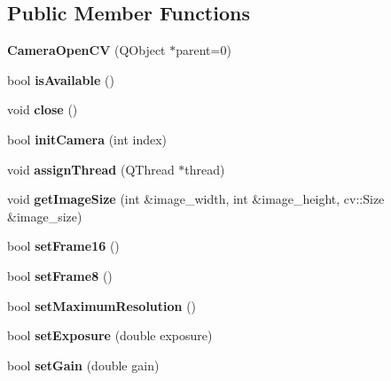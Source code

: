 \subsection*{Public Member Functions}
\begin{DoxyCompactItemize}
\item 
\hypertarget{class_camera_open_c_v_a11513f82fb6525837b669a1f577a4b4c}{}{\bfseries Camera\+Open\+C\+V} (Q\+Object $\ast$parent=0)\label{class_camera_open_c_v_a11513f82fb6525837b669a1f577a4b4c}

\item 
\hypertarget{class_camera_open_c_v_a4f74abae529642b30ed20e7edd34f242}{}bool {\bfseries is\+Available} ()\label{class_camera_open_c_v_a4f74abae529642b30ed20e7edd34f242}

\item 
\hypertarget{class_camera_open_c_v_af0aaccf4308f82ce69f9291734145b0f}{}void {\bfseries close} ()\label{class_camera_open_c_v_af0aaccf4308f82ce69f9291734145b0f}

\item 
\hypertarget{class_camera_open_c_v_a85716a1a309bf8269d3767002989c126}{}bool {\bfseries init\+Camera} (int index)\label{class_camera_open_c_v_a85716a1a309bf8269d3767002989c126}

\item 
\hypertarget{class_camera_open_c_v_a2790e5210b7dc3a4b096e95458c6264a}{}void {\bfseries assign\+Thread} (Q\+Thread $\ast$thread)\label{class_camera_open_c_v_a2790e5210b7dc3a4b096e95458c6264a}

\item 
\hypertarget{class_camera_open_c_v_a7b63193973da529de09142fffac0555e}{}void {\bfseries get\+Image\+Size} (int \&image\+\_\+width, int \&image\+\_\+height, cv\+::\+Size \&image\+\_\+size)\label{class_camera_open_c_v_a7b63193973da529de09142fffac0555e}

\item 
\hypertarget{class_camera_open_c_v_ab79a0b312192ae4a76aee9019271b4c0}{}bool {\bfseries set\+Frame16} ()\label{class_camera_open_c_v_ab79a0b312192ae4a76aee9019271b4c0}

\item 
\hypertarget{class_camera_open_c_v_a919ff5c55965b8d27ebb3e092398873f}{}bool {\bfseries set\+Frame8} ()\label{class_camera_open_c_v_a919ff5c55965b8d27ebb3e092398873f}

\item 
\hypertarget{class_camera_open_c_v_af090db8f2a6edfaece533b2fdbbd9a21}{}bool {\bfseries set\+Maximum\+Resolution} ()\label{class_camera_open_c_v_af090db8f2a6edfaece533b2fdbbd9a21}

\item 
\hypertarget{class_camera_open_c_v_a1214731f8a3bd3cfbc11a065bc93c806}{}bool {\bfseries set\+Exposure} (double exposure)\label{class_camera_open_c_v_a1214731f8a3bd3cfbc11a065bc93c806}

\item 
\hypertarget{class_camera_open_c_v_af1a30a1dda23ba15ffc4feb41718e7e6}{}bool {\bfseries set\+Gain} (double gain)\label{class_camera_open_c_v_af1a30a1dda23ba15ffc4feb41718e7e6}

\end{DoxyCompactItemize}


